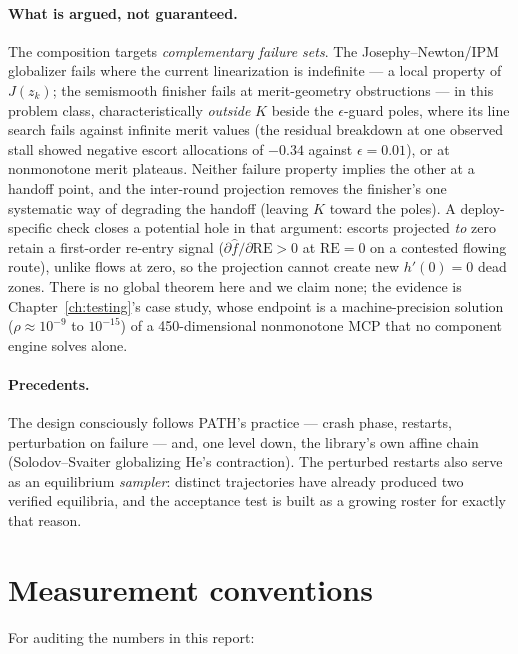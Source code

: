 \paragraph{What is argued, not guaranteed.} The composition targets
\emph{complementary failure sets}. The Josephy--Newton/IPM globalizer fails
where the current linearization is indefinite --- a local property of
$J(z_k)$; the semismooth finisher fails at merit-geometry obstructions ---
in this problem class, characteristically \emph{outside} $K$ beside the
$\epsilon$-guard poles, where its line search fails against infinite merit
values (the residual breakdown at one observed stall showed negative
escort allocations of $-0.34$ against $\epsilon = 0.01$), or at
nonmonotone merit plateaus. Neither failure property implies the other at
a handoff point, and the inter-round projection removes the finisher's one
systematic way of degrading the handoff (leaving $K$ toward the poles). A
deploy-specific check closes a potential hole in that argument: escorts
projected \emph{to} zero retain a first-order re-entry signal
($\partial \hat f/\partial \mathrm{RE} > 0$ at $\mathrm{RE} = 0$ on a
contested flowing route), unlike flows at zero, so the projection cannot
create new $h'(0) = 0$ dead zones. There is no global theorem here and we
claim none; the evidence is Chapter~\ref{ch:testing}'s case study, whose
endpoint is a machine-precision solution ($\rho \approx 10^{-9}$ to
$10^{-15}$) of a 450-dimensional nonmonotone MCP that no component engine
solves alone.

\paragraph{Precedents.} The design consciously follows PATH's practice ---
crash phase, restarts, perturbation on failure \cite{ferris1998} --- and,
one level down, the library's own affine chain (Solodov--Svaiter
globalizing He's contraction). The perturbed restarts also serve as an
equilibrium \emph{sampler}: distinct trajectories have already produced two
verified equilibria, and the acceptance test is built as a growing roster
for exactly that reason.

\section{Measurement conventions}
\label{sec:a-measure}

For auditing the numbers in this report:

